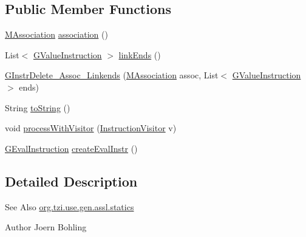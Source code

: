 \subsection*{Public Member Functions}
\begin{DoxyCompactItemize}
\item 
\hyperlink{interfaceorg_1_1tzi_1_1use_1_1uml_1_1mm_1_1_m_association}{M\-Association} \hyperlink{classorg_1_1tzi_1_1use_1_1gen_1_1assl_1_1statics_1_1_g_instr_delete___assoc___linkends_aabbf064ee2e3fd7cdff884d49bdd323e}{association} ()
\item 
List$<$ \hyperlink{interfaceorg_1_1tzi_1_1use_1_1gen_1_1assl_1_1statics_1_1_g_value_instruction}{G\-Value\-Instruction} $>$ \hyperlink{classorg_1_1tzi_1_1use_1_1gen_1_1assl_1_1statics_1_1_g_instr_delete___assoc___linkends_a94347581f74d5caa70f50201af38a98c}{link\-Ends} ()
\item 
\hyperlink{classorg_1_1tzi_1_1use_1_1gen_1_1assl_1_1statics_1_1_g_instr_delete___assoc___linkends_a873e6f54f81a5e030a00559dc50afa9d}{G\-Instr\-Delete\-\_\-\-Assoc\-\_\-\-Linkends} (\hyperlink{interfaceorg_1_1tzi_1_1use_1_1uml_1_1mm_1_1_m_association}{M\-Association} assoc, List$<$ \hyperlink{interfaceorg_1_1tzi_1_1use_1_1gen_1_1assl_1_1statics_1_1_g_value_instruction}{G\-Value\-Instruction} $>$ ends)
\item 
String \hyperlink{classorg_1_1tzi_1_1use_1_1gen_1_1assl_1_1statics_1_1_g_instr_delete___assoc___linkends_aca5774f6ba6de3bd633316f3f2f0cde4}{to\-String} ()
\item 
void \hyperlink{classorg_1_1tzi_1_1use_1_1gen_1_1assl_1_1statics_1_1_g_instr_delete___assoc___linkends_a6fd7653bf46566efb22e9c003d844830}{process\-With\-Visitor} (\hyperlink{interfaceorg_1_1tzi_1_1use_1_1gen_1_1assl_1_1statics_1_1_instruction_visitor}{Instruction\-Visitor} v)
\item 
\hyperlink{classorg_1_1tzi_1_1use_1_1gen_1_1assl_1_1dynamics_1_1_g_eval_instruction}{G\-Eval\-Instruction} \hyperlink{classorg_1_1tzi_1_1use_1_1gen_1_1assl_1_1statics_1_1_g_instr_delete___assoc___linkends_accf99b8d9fda209fd0dfe0e7cfcef091}{create\-Eval\-Instr} ()
\end{DoxyCompactItemize}


\subsection{Detailed Description}
\begin{DoxySeeAlso}{See Also}
\hyperlink{namespaceorg_1_1tzi_1_1use_1_1gen_1_1assl_1_1statics}{org.\-tzi.\-use.\-gen.\-assl.\-statics} 
\end{DoxySeeAlso}
\begin{DoxyAuthor}{Author}
Joern Bohling 
\end{DoxyAuthor}



